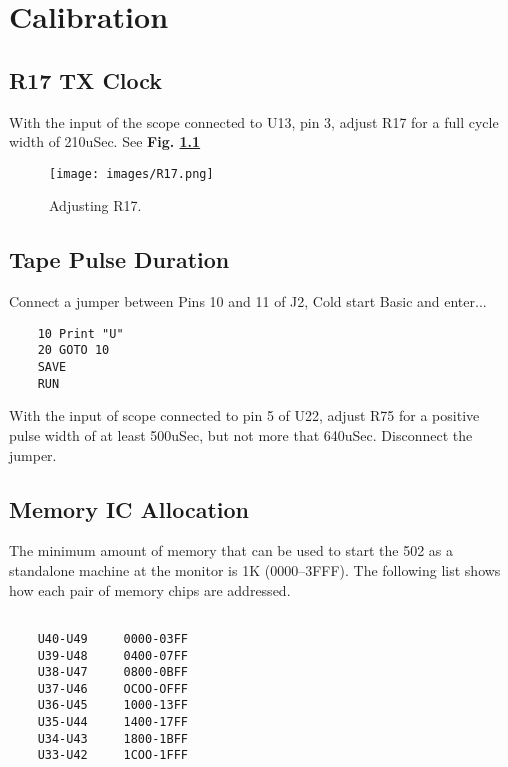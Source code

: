 \chapter{Calibration}

\section{R17 TX Clock}

With the input of the scope connected to U13, pin 3, adjust R17 for a full cycle width of 210uSec. See \textbf{Fig. \ref{fig:r17}}

\begin{figure}[htbp]
    \begin{center}
    \texttt{[image: images/R17.png]}
    \caption{Adjusting R17.}
    \label{fig:r17}
    \end{center}
    \end{figure}

\section{Tape Pulse Duration}

Connect a jumper between Pins 10 and 11 of J2, Cold start Basic and enter...

\begin{verbatim}
    10 Print "U"
    20 GOTO 10
    SAVE
    RUN
\end{verbatim}

With the input of scope connected to pin 5 of U22, adjust R75 for a positive pulse width of at least 500uSec, but not more that 640uSec. Disconnect the jumper.

\section{Memory IC Allocation}

The minimum amount of memory that can be used to start the 502 as a standalone machine at the monitor is 1K (0000--3FFF). The following list shows how each pair of memory chips are addressed.

\begin{verbatim}
    
    U40-U49     0000-03FF
    U39-U48     0400-07FF
    U38-U47     0800-0BFF
    U37-U46     OCOO-OFFF
    U36-U45     1000-13FF
    U35-U44     1400-17FF
    U34-U43     1800-1BFF
    U33-U42     1COO-1FFF

\end{verbatim}
